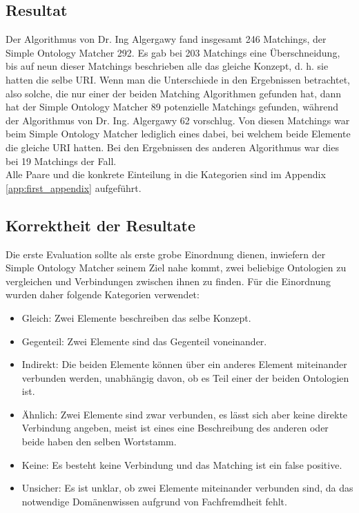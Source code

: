 		\subsection{Resultat}
		Der Algorithmus von Dr. Ing Algergawy fand insgesamt 246 Matchings, der Simple
		Ontology Matcher 292. Es gab bei 203 Matchings eine
		Überschneidung, bis auf neun dieser Matchings beschrieben alle das
		gleiche Konzept, d. h. sie hatten die selbe URI.
		Wenn man die Unterschiede in den Ergebnissen betrachtet, also solche, die nur
		einer der beiden Matching Algorithmen gefunden hat, dann hat der Simple
		Ontology Matcher 89 potenzielle Matchings gefunden, während der Algorithmus
		von Dr. Ing. Algergawy 62 vorschlug. Von diesen Matchings war beim Simple
		Ontology Matcher lediglich eines dabei, bei welchem beide Elemente die gleiche
		URI hatten. Bei den Ergebnissen des anderen Algorithmus war dies bei 19
		Matchings der Fall.\\
		Alle Paare und die konkrete Einteilung in die Kategorien sind im Appendix
		\ref{app:first_appendix}
		aufgeführt.
		
		\subsection{Korrektheit der Resultate}
		Die erste Evaluation sollte als erste grobe Einordnung dienen, inwiefern
		der Simple Ontology Matcher seinem Ziel nahe kommt, zwei beliebige Ontologien
		zu vergleichen und Verbindungen zwischen ihnen zu finden. Für die Einordnung
		wurden daher folgende Kategorien verwendet:\\
		\begin{itemize}
		  \item Gleich: Zwei Elemente beschreiben das selbe Konzept.
		  \item Gegenteil: Zwei Elemente sind das Gegenteil voneinander.
		  \item Indirekt: Die beiden Elemente können über ein anderes Element
		  miteinander verbunden werden, unabhängig davon, ob es Teil einer der beiden
		  Ontologien ist.
		  \item Ähnlich: Zwei Elemente sind zwar verbunden, es lässt sich aber keine
		  direkte Verbindung angeben, meist ist eines eine Beschreibung des anderen
		  oder beide haben den selben Wortstamm.
		  \item Keine: Es besteht keine Verbindung und das Matching ist ein false
		  positive.
		  \item Unsicher: Es ist unklar, ob zwei Elemente miteinander verbunden sind,
		  da das notwendige Domänenwissen aufgrund von Fachfremdheit fehlt.
		\end{itemize}
		
